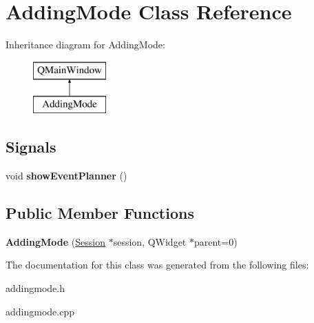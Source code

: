 \hypertarget{class_adding_mode}{}\section{Adding\+Mode Class Reference}
\label{class_adding_mode}
Inheritance diagram for Adding\+Mode\+:\begin{figure}[H]
\begin{center}
\leavevmode
\includegraphics[height=2.000000cm]{class_adding_mode}
\end{center}
\end{figure}
\subsection*{Signals}
\begin{DoxyCompactItemize}
\item 
\mbox{\label{class_adding_mode_ac9a9d671ccfc803f9844cde060a12ca5}} 
void {\bfseries show\+Event\+Planner} ()
\end{DoxyCompactItemize}
\subsection*{Public Member Functions}
\begin{DoxyCompactItemize}
\item 
\mbox{\label{class_adding_mode_aa8830870d671f8d806bedd0ecf03d065}} 
{\bfseries Adding\+Mode} (\hyperlink{class_session}{Session} $\ast$session, Q\+Widget $\ast$parent=0)
\end{DoxyCompactItemize}


The documentation for this class was generated from the following files\+:\begin{DoxyCompactItemize}
\item 
addingmode.\+h\item 
addingmode.\+cpp\end{DoxyCompactItemize}
